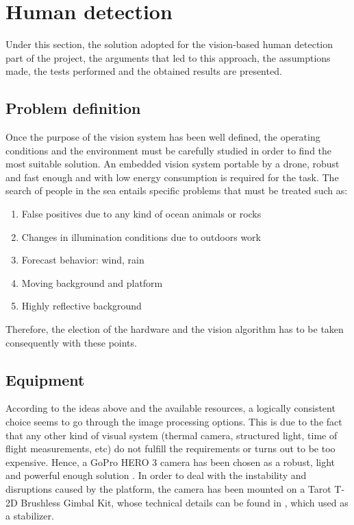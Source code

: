 \chapter{Human detection}
Under this section, the solution adopted for the vision-based human detection part of the project,
the arguments that led to this approach, the assumptions made,
the tests performed and the obtained results are presented. 

\section{Problem definition}
Once the purpose of the vision system has been well defined,
the operating conditions and the environment must be carefully studied in order to find the most suitable solution.
An embedded vision system portable by a drone, robust and fast enough and with low energy consumption is required for the task. 
The search of people in the sea entails specific problems that must be treated such as:

\begin{enumerate}[itemsep=1mm,topsep=1mm,leftmargin=.35in]
    \label{list: problem_def}
    \item False positives due to any kind of ocean animals or rocks
    \item Changes in illumination conditions due to outdoors work
    \item Forecast behavior: wind, rain
    \item Moving background and platform
    \item Highly reflective background
\end{enumerate}%

Therefore, the election of the hardware and the vision algorithm has to be taken consequently with these points.

\section{Equipment}
According to the ideas above and the available resources,
a logically consistent choice seems to go through the image processing options. 
This is due to the fact that any other kind of visual system
(thermal camera, structured light, time of flight measurements, etc) do not fulfill the requirements or turns out to be too expensive.
Hence, a GoPro HERO 3 camera has been chosen as a robust, light and powerful enough solution \cite{ref:GoPro}.
In order to deal with the instability and disruptions caused by the platform,
the camera has been mounted on a Tarot T-2D Brushless Gimbal Kit, whose technical details
can be found in \cite{Ref:Gimbal}, which used as a stabilizer.

